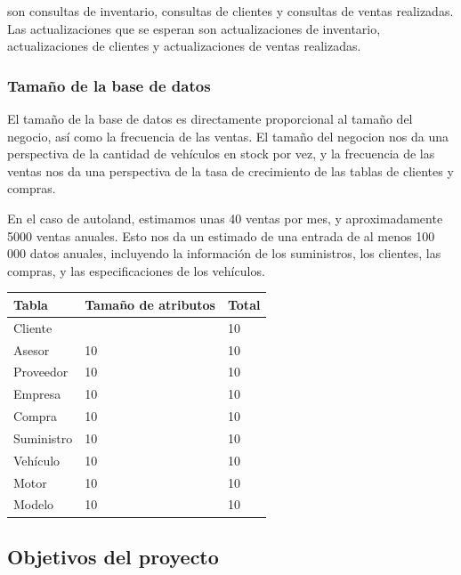 \documentclass[12pt]{article}
\begin{document}
son consultas de inventario, consultas de clientes y consultas de ventas realizadas. Las actualizaciones que se esperan son actualizaciones de inventario, actualizaciones de clientes y actualizaciones de ventas realizadas.


\subsubsection{Tama\~no de la base de datos}

El tamaño de la base de datos es directamente proporcional al tamaño del negocio, así como la frecuencia de las ventas. El tamaño del negocion nos da una perspectiva de la cantidad de vehículos en stock por vez, y la frecuencia de las ventas nos da una perspectiva de la tasa de crecimiento de las tablas de clientes y compras.

En el caso de autoland, estimamos unas 40 ventas por mes, y aproximadamente 5000 ventas anuales. Esto nos da un estimado de una entrada de al menos 100 000 datos anuales, incluyendo la información de los suministros, los clientes, las compras, y las especificaciones de los vehículos.

\begin{tabular}{|l|l|l|}
\hline
\textbf{Tabla} & \textbf{Tamaño de atributos} & \textbf{Total} \\ \hline
Cliente       &                            & 10             \\ \hline
Asesor        & 10                           & 10             \\ \hline
Proveedor     & 10                           & 10             \\ \hline
Empresa       & 10                           & 10             \\ \hline
Compra        & 10                           & 10             \\ \hline
Suministro    & 10                           & 10             \\ \hline
Vehículo      & 10                           & 10             \\ \hline
Motor         & 10                           & 10             \\ \hline
Modelo        & 10                           & 10             \\ \hline
\end{tabular}

\subsection{Objetivos del proyecto}
\end{document}
